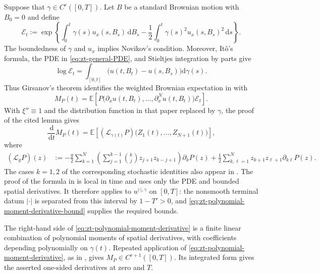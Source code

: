 \documentclass[10pt]{amsart}
\theoremstyle{definition}
\theoremstyle{remark}
\numberwithin{equation}{section}
\newcommand{\E}{\mathbb E}
\newcommand{\1}{\mathbf 1}
\newcommand{\dd}{\,\mathrm d}
\begin{document}
Suppose that $\gamma\in C^r([0,T])$. Let $B$ be a standard Brownian motion with $B_0=0$ and define
\begin{equation*}
 \mathcal E_t:=\exp\left\{\int_0^t\gamma(s)u_x(s,B_s)\dd B_s-\frac12\int_0^t\gamma(s)^2u_x(s,B_s)^2\dd s\right\}.
\end{equation*}
The boundedness of $\gamma$ and $u_x$ implies Novikov's condition. Moreover, It\^o's formula, the PDE in \eqref{eq:zt-general-PDE}, and Stieltjes integration by parts give
\begin{equation*}
 \log\mathcal E_t=\int_{[0,t]}\bigl(u(t,B_t)-u(s,B_s)\bigr)\mathrm d\gamma(s).
\end{equation*}
Thus Girsanov's theorem identifies the weighted Brownian expectation in \cite[Proposition~1(ii) and Lemma~2, equations~(37)--(38)]{AuffingerChenProperties} with
\begin{equation*}
 M_P(t)=\E\left[P\bigl(\partial_xu(t,B_t),\ldots,\partial_x^Nu(t,B_t)\bigr)\mathcal E_t\right].
\end{equation*}
With $\xi''\equiv1$ and the distribution function in that paper replaced by $\gamma$, the proof of the cited lemma gives
\begin{equation}
 \frac{\dd}{\dd t}M_P(t)=\E\left[(\mathcal L_{\gamma(t)}P)\bigl(Z_1(t),\ldots,Z_{N+1}(t)\bigr)\right],
 \label{eq:zt-polynomial-moment-derivative}
\end{equation}
where
\begin{align*}
 (\mathcal L_gP)(z)&:=-\frac g2\sum_{k=1}^N\left(\sum_{j=1}^{k-1}\binom{k}{j}z_{j+1}z_{k-j+1}\right)\partial_kP(z)+\frac12\sum_{k,\ell=1}^Nz_{k+1}z_{\ell+1}\partial_{k\ell}P(z).
\end{align*}
The cases $k=1,2$ of the corresponding stochastic identities also appear in \cite[Lemma~3, equations~(14)--(15)]{ChenHandschyLerman}. The proof of the formula in \cite[Lemma~2]{AuffingerChenProperties} is local in time and uses only the PDE and bounded spatial derivatives. It therefore applies to $u^{|\cdot|,\gamma}$ on $[0,T]$: the nonsmooth terminal datum $|\cdot|$ is separated from this interval by $1-T'>0$, and \eqref{eq:zt-polynomial-moment-derivative-bound} supplies the required bounds.

The right-hand side of \eqref{eq:zt-polynomial-moment-derivative} is a finite linear combination of polynomial moments of spatial derivatives, with coefficients depending polynomially on $\gamma(t)$. Repeated application of \eqref{eq:zt-polynomial-moment-derivative}, as in \cite[proof of Theorem~2(ii)]{AuffingerChenProperties}, gives $M_P\in C^{r+1}([0,T])$. Its integrated form gives the asserted one-sided derivatives at zero and $T$.
\end{document}
